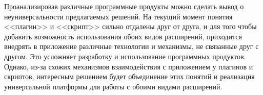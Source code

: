 Проанализировав различные программные продукты можно сделать вывод о неуниверсальности предлагаемых решений. На текущий момент понятия <<плагин>> и <<скрипт>> сильно отдалены друг от друга, и для того чтобы добавить возможность использования обоих видов расширений, приходится внедрять в приложение различные технологии и механизмы, не связанные друг с другом. Это усложняет разработку и использование программных продуктов. Однако, из-за схожих механизмов взаимодействия с приложением у плагинов и скриптов, интересным решением будет объединение этих понятий и реализация универсальной платформы для работы с обоими видами расширений.

\pagebreak
